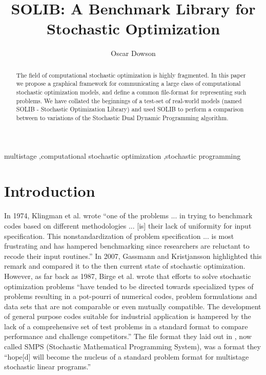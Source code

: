 \documentclass[final,1p,times]{elsarticle}
\begin{document}
\begin{frontmatter}

\title{SOLIB: A Benchmark Library for Stochastic Optimization}

\author[label1]{Oscar Dowson}
\address[label1]{Department of Engineering Science at The University of Auckland, 70 Symonds Street, Auckland 1010, New Zealand}


\begin{abstract}
    The field of computational stochastic optimization is highly fragmented. In this paper we propose a graphical framework for communicating a large class of computational stochastic optimization models, and define a common file-format for representing such problems. We have collated the beginnings of a test-set of real-world models (named SOLIB - Stochastic Optimization Library) and used SOLIB to perform a comparison between to variations of the Stochastic Dual Dynamic Programming algorithm.
\end{abstract}

\begin{keyword}
multistage \sep computational stochastic optimization \sep stochastic programming
\end{keyword}

\end{frontmatter}

\section{Introduction}

In 1974, Klingman et al. \cite{klingman} wrote ``one of the problems ... in trying to benchmark codes based on different methodologies ... [is] their lack of uniformity for input specification. This nonstandardization of problem specification ... is most frustrating and has hampered benchmarking since researchers are reluctant to recode their input routines.'' In 2007, Gassmann and Kristjansson \cite{smps} highlighted this remark and compared it to the then current state of stochastic optimization. However, as far back as 1987, Birge et al. \cite{birge} wrote that efforts to solve stochastic optimization problems ``have tended to be directed towards specialized types of problems resulting in a pot-pourri of numerical codes, problem formulations and data sets that are not comparable or even mutually compatible. The development of general purpose codes suitable for industrial application is hampered by the lack of a comprehensive set of test problems in a standard format to compare performance and challenge competitors.'' The file format they laid out in \cite{birge}, now called SMPS (Stochastic Mathematical Programming System), was a format they ``hope[d] will become the nucleus of a standard problem format for multistage stochastic linear programs.''
\end{document}

